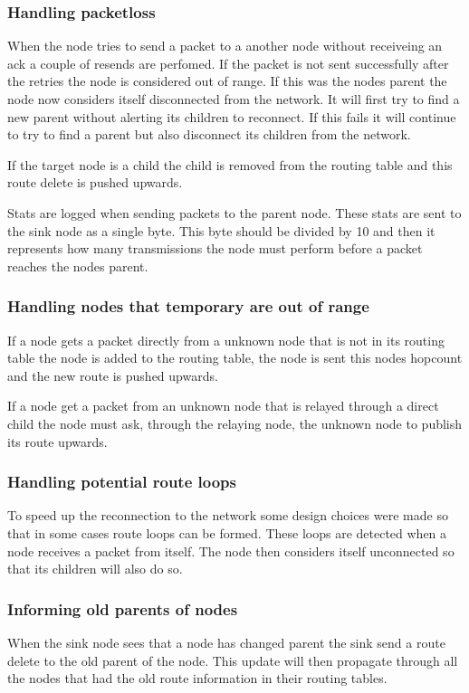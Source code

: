 \documentclass[a4paper,11pt]{article}
\begin{document}
\subsubsection{Handling packetloss}
When the node tries to send a packet to a another node without
receiveing an ack a couple of resends are perfomed. If the packet is
not sent successfully after the retries the node is considered out of
range. If this was the nodes parent the node now considers itself
disconnected from the network. It will first try to find a new parent
without alerting its children to reconnect. If this fails it will
continue to try to find a parent but also disconnect its children from
the network.

If the target node is a child the child is removed from the routing
table and this route delete is pushed upwards.

Stats are logged when sending packets to the parent node. These stats
are sent to the sink node as a single byte. This byte should be
divided by 10 and then it represents how many transmissions the node
must perform before a packet reaches the nodes parent.

\subsubsection{Handling nodes that temporary are out of range}
If a node gets a packet directly from a unknown node that is not in
its routing table the node is added to the routing table, the node is
sent this nodes hopcount and the new route is pushed upwards.

If a node get a packet from an unknown node that is relayed through a
direct child the node must ask, through the relaying node, the unknown
node to publish its route upwards.

\subsubsection{Handling potential route loops}
To speed up the reconnection to the network some design choices were
made so that in some cases route loops can be formed. These loops are
detected when a node receives a packet from itself. The node then
considers itself unconnected so that its children will also do so.

\subsubsection{Informing old parents of nodes}
When the sink node sees that a node has changed parent the sink send a
route delete to the old parent of the node. This update will then
propagate through all the nodes that had the old route information in
their routing tables.
\end{document}
